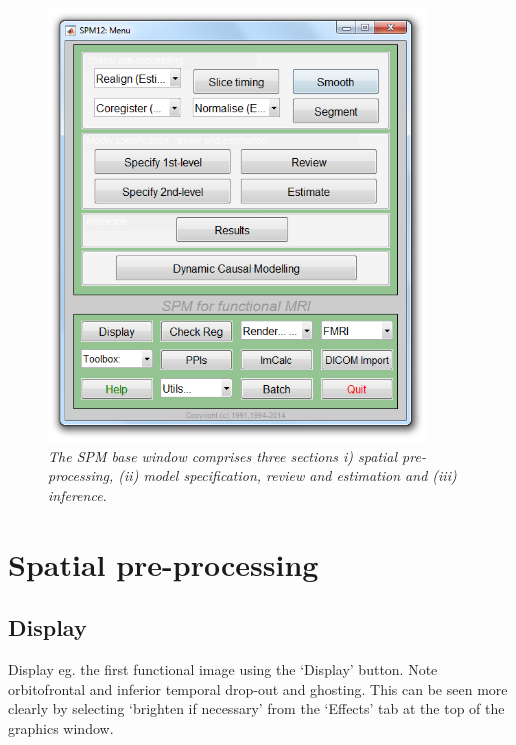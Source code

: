 \begin{figure}
\begin{center}
\includegraphics[width=100mm]{faces/command}
\caption{\em The SPM base window comprises three sections i) spatial pre-processing, (ii) model specification, review and estimation and (iii) inference. \label{face_command}}
\end{center}
\end{figure}

\section{Spatial pre-processing}

\subsection{Display}

Display eg. the first functional image using the `Display' button. Note orbitofrontal and inferior temporal drop-out and ghosting. This can be seen more clearly by selecting `brighten if necessary' from the `Effects' tab at the top of the graphics window.

